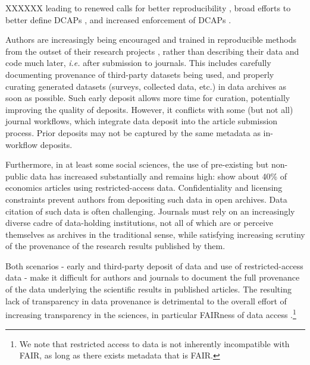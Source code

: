 {XXXXXX leading to renewed calls for better reproducibility \parencite{stodden_enhancing_2016}, broad efforts to better define \acp{DCAP} \parencite{CenterforOpenScience2016,HrynaszkiewiczInt.J.Digit.Curation2017}, and increased enforcement of \acp{DCAP} \parencite{JacobyInsideHigherEd2017,10.1257/pandp.108.745,VilhuberAEAPap.Proc.2019}.

Authors are increasingly being encouraged and trained in reproducible methods from the outset of their research projects \citep{WilsonArXiv160900037Cs2016,Christensen2019a}, rather than describing their data and code much later, \textit{i.e.} after submission to journals. This includes carefully documenting provenance of third-party datasets being used, and properly curating generated datasets (surveys, collected data, etc.) in data archives as soon as possible. Such early deposit allows more time for curation, potentially improving the quality of deposits. However, it conflicts with some (but not all) journal workflows, which integrate data deposit into the article submission process. Prior deposits may not be captured by the same metadata as in-workflow deposits.

Furthermore, in at least some social sciences, the use of pre-existing but non-public data has increased substantially \parencite{Chetty2012} and remains high: \cite{Kingi2018} show about 40\% of economics articles using restricted-access data.  Confidentiality and licensing constraints prevent authors from depositing such data in open archives. Data citation \parencite{DataCitationSynthesisGroup2014} of such data is often challenging. Journals must rely on an increasingly diverse cadre of data-holding institutions, not all of which are or perceive themselves as archives in the traditional sense, while satisfying increasing scrutiny of the provenance of the research results published by them. 

Both scenarios - early and third-party deposit of data and use of restricted-access data - make it difficult for authors and journals to document the full provenance of the data underlying the scientific results in published articles. The resulting lack of transparency in data provenance is detrimental to the overall effort of increasing transparency in the sciences, in particular FAIRness of data access \citep{HagstromFORCE112014}.\footnote{We note that restricted access to data is not inherently incompatible with FAIR, as long as there exists metadata that is FAIR.}

}
